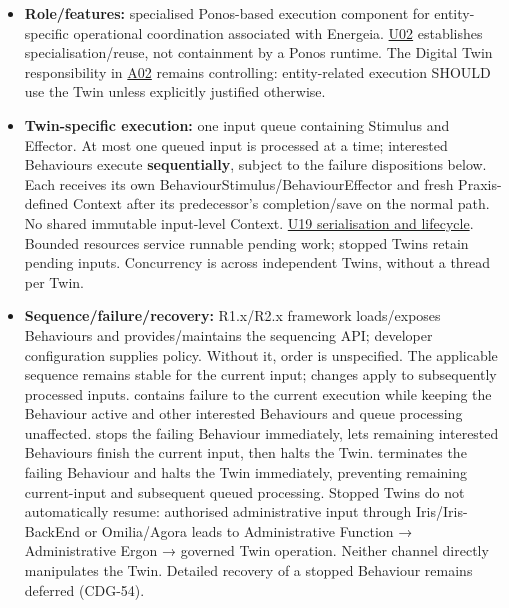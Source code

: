 \begin{itemize}


\item \textbf{Role/features:} specialised Ponos-based execution component for entity-specific
  operational coordination associated with Energeia. \href{\detokenize{../../../../../../../../docs/markdown/05-information-systems-architecture/sources.md#u02}}{U02} establishes
  specialisation/reuse, not containment by a Ponos runtime. The Digital Twin
  responsibility in \href{\detokenize{../../../../../../../../docs/markdown/05-information-systems-architecture/sources.md#a02}}{A02} remains controlling: entity-related
  execution SHOULD use the Twin unless explicitly justified otherwise.

\item \textbf{Twin-specific execution:} one input queue containing Stimulus and Effector.
  At most one queued input is processed at a time; interested Behaviours execute
  \textbf{sequentially}, subject to the failure dispositions below. Each receives its
  own BehaviourStimulus/BehaviourEffector and fresh Praxis-defined Context after
  its predecessor's completion/save on the normal path. No shared immutable
  input-level Context.
  \href{\detokenize{../../../../../../../../docs/markdown/05-information-systems-architecture/design-notes/DesignNote-Digital-Twin-Behaviour-and-Execution-Semantics.md}}{U19 serialisation and lifecycle}.
  Bounded resources service runnable pending work; stopped Twins retain pending
  inputs. Concurrency is across independent Twins, without a thread per Twin.

\item \textbf{Sequence/failure/recovery:} R1.x/R2.x framework loads/exposes Behaviours and
  provides/maintains the sequencing API; developer configuration supplies policy.
  Without it, order is unspecified. The applicable sequence remains stable for
  the current input; changes apply to subsequently processed inputs.
  \texttt{} contains failure to the current execution while
  keeping the Behaviour active and other interested Behaviours and queue processing
  unaffected. \texttt{} stops the failing Behaviour immediately,
  lets remaining interested Behaviours finish the current input, then halts the
  Twin. \texttt{} terminates the failing Behaviour and halts the
  Twin immediately, preventing remaining current-input and subsequent queued
  processing. Stopped Twins do not
  automatically resume: authorised administrative input through Iris/Iris-BackEnd
  or Omilia/Agora leads to Administrative Function → Administrative Ergon →
  governed Twin operation. Neither channel directly manipulates the Twin.
  Detailed recovery of a stopped Behaviour remains deferred (CDG-54).


\end{itemize}
